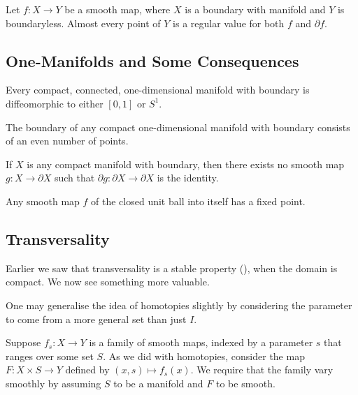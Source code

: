\documentclass[12pt]{article}
\begin{document}
\begin{thm} \label{thm:sard-boundary}
	Let $f : X \to Y$ be a smooth map, where $X$ is a boundary with manifold and $Y$ is boundaryless. Almost every point of $Y$ is a regular value for both $f$ and $\partial f$.
\end{thm}

\subsection{One-Manifolds and Some Consequences}

\begin{thm}
	Every compact, connected, one-dimensional manifold with boundary is diffeomorphic to either $[0, 1]$ or $S^{1}$.
\end{thm}

\begin{cor}
	The boundary of any compact one-dimensional manifold with boundary consists of an even number of points.
\end{cor}

\begin{thm}
	If $X$ is any compact manifold with boundary, then there exists no smooth map $g : X \to \partial X$ such that $\partial g : \partial X \to \partial X$ is the identity.
\end{thm}

\begin{thm}
	Any smooth map $f$ of the closed unit ball into itself has a fixed point.
\end{thm}

\subsection{Transversality}

Earlier we saw that transversality is a stable property (), when the domain is compact. We now see something more valuable.

\begin{rem}
	One may generalise the idea of homotopies slightly by considering the parameter to come from a more general set than just $I$.

	Suppose $f_{s} : X \to Y$ is a family of smooth maps, indexed by a parameter $s$ that ranges over some set $S$. As we did with homotopies, consider the map $F : X \times S \to Y$ defined by $(x, s) \mapsto f_{s}(x)$. We require that the family vary smoothly by assuming $S$ to be a manifold and $F$ to be smooth.
\end{rem}
\end{document}
